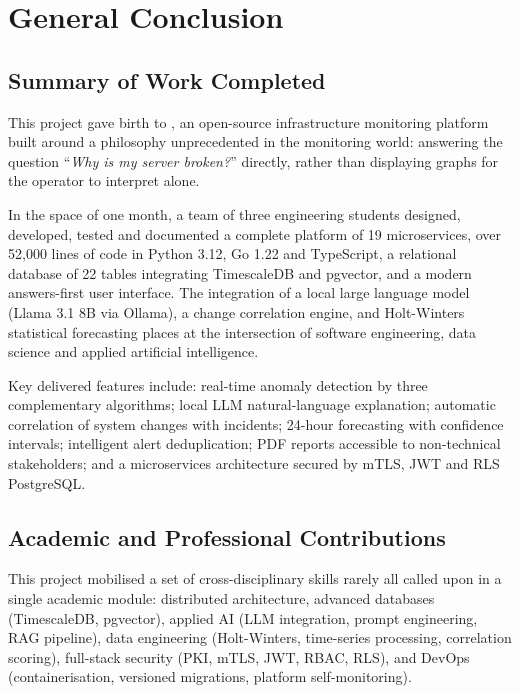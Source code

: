 \chapter{General Conclusion}

\section{Summary of Work Completed}

This project gave birth to \textbf{\caimp{}}, an open-source infrastructure
monitoring platform built around a philosophy unprecedented in the monitoring
world: answering the question ``\textit{Why is my server broken?}'' directly,
rather than displaying graphs for the operator to interpret alone.

In the space of one month, a team of three engineering students designed,
developed, tested and documented a complete platform of 19 microservices, over
52,000 lines of code in Python 3.12, Go 1.22 and TypeScript, a relational
database of 22 tables integrating TimescaleDB and pgvector, and a modern
answers-first user interface. The integration of a local large language model
(Llama 3.1 8B via Ollama), a change correlation engine, and Holt-Winters
statistical forecasting places \caimp{} at the intersection of software
engineering, data science and applied artificial intelligence.

Key delivered features include: real-time anomaly detection by three
complementary algorithms; local LLM natural-language explanation; automatic
correlation of system changes with incidents; 24-hour forecasting with confidence
intervals; intelligent alert deduplication; PDF reports accessible to
non-technical stakeholders; and a microservices architecture secured by mTLS,
JWT and RLS PostgreSQL.

\section{Academic and Professional Contributions}

This project mobilised a set of cross-disciplinary skills rarely all called upon
in a single academic module: distributed architecture, advanced databases
(TimescaleDB, pgvector), applied AI (LLM integration, prompt engineering, RAG
pipeline), data engineering (Holt-Winters, time-series processing, correlation
scoring), full-stack security (PKI, mTLS, JWT, RBAC, RLS), and DevOps
(containerisation, versioned migrations, platform self-monitoring).

